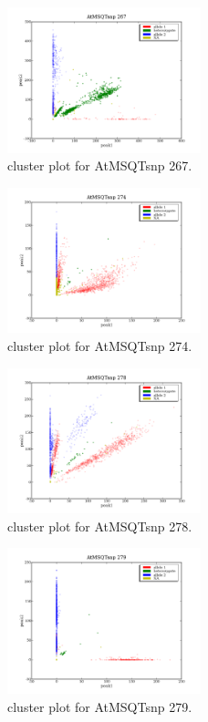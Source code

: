 \begin{figure}[H]
\includegraphics[width=0.5\textwidth]{figures/cluster_plot_AtMSQTsnp_267.png}
\caption{cluster plot for AtMSQTsnp 267.} \label{flAtMSQTsnp267}
\end{figure}
\begin{figure}[H]
\includegraphics[width=0.5\textwidth]{figures/cluster_plot_AtMSQTsnp_274.png}
\caption{cluster plot for AtMSQTsnp 274.} \label{flAtMSQTsnp274}
\end{figure}
\begin{figure}[H]
\includegraphics[width=0.5\textwidth]{figures/cluster_plot_AtMSQTsnp_278.png}
\caption{cluster plot for AtMSQTsnp 278.} \label{flAtMSQTsnp278}
\end{figure}
\begin{figure}[H]
\includegraphics[width=0.5\textwidth]{figures/cluster_plot_AtMSQTsnp_279.png}
\caption{cluster plot for AtMSQTsnp 279.} \label{flAtMSQTsnp279}
\end{figure}

